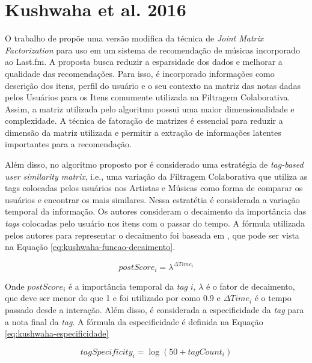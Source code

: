 \section{Kushwaha et al. 2016}

O trabalho de  propõe uma versão modifica da técnica de \textit{Joint Matrix Factorization}
para uso em um sistema de recomendação de músicas incorporado ao Last.fm. A proposta busca reduzir a esparsidade dos
dados e melhorar a qualidade das recomendações. Para isso, é incorporado informações como descrição dos itens, perfil
do usuário e o seu contexto na matriz das notas dadas pelos Usuários para os Itens comumente utilizada na Filtragem
Colaborativa. Assim, a matriz utilizada pelo algoritmo possui uma maior dimensionalidade e complexidade. A técnica de fatoração de
matrizes é essencial para reduzir a dimensão da matriz utilizada e permitir a extração de informações latentes importantes para a
recomendação.

Além disso, no algoritmo proposto por  é considerado uma estratégia de \textit{tag-based
user similarity matrix}, i.e., uma variação da Filtragem Colaborativa que utiliza as tags colocadas pelos usuários nos Artistas
e Músicas como forma de comparar os usuários e encontrar os mais similares. Nessa estratétia é considerada a variação
temporal da informação. Os autores consideram o decaimento da importância das \textit{tags} colocadas pelo usuário nos
itens com o passar do tempo. A fórmula utilizada pelos autores para representar o decaimento foi baseada em
, que pode ser vista na Equação \ref{eq:kushwaha-funcao-decaimento}.

\begin{equation}
  \label{eq:kushwaha-funcao-decaimento}
  postScore_i = \lambda^{\Delta Time_i}
\end{equation}

Onde $postScore_i$ é a importância temporal da \textit{tag} $i$, $\lambda$ é o fator de decaimento, que deve ser menor do que 1
e foi utilizado por  como 0.9 e $\Delta Time_i$ é o tempo passado desde a interação. Além disso,
é considerada a especificidade da \textit{tag} para a nota final da \textit{tag}. A fórmula da especificidade é definida
na Equação \ref{eq:kushwaha-especificidade}

\begin{equation}
  \label{eq:kushwaha-especificidade}
  tagSpecificity_i = \log(50+tagCount_i)
\end{equation}

